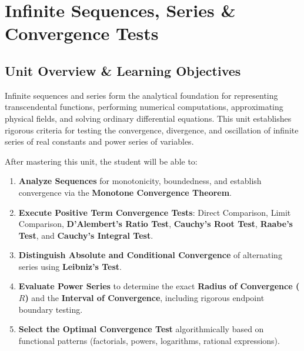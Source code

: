 \chapter{Infinite Sequences, Series \& Convergence Tests}
\label{chap:infinite-series-and-power-series}

\section{Unit Overview \& Learning Objectives}

Infinite sequences and series form the analytical foundation for representing transcendental functions, performing numerical computations, approximating physical fields, and solving ordinary differential equations. This unit establishes rigorous criteria for testing the convergence, divergence, and oscillation of infinite series of real constants and power series of variables.

\begin{important}
After mastering this unit, the student will be able to:
\begin{enumerate}[leftmargin=1.5em]
    \item \textbf{Analyze Sequences} for monotonicity, boundedness, and establish convergence via the \textbf{Monotone Convergence Theorem}.
    \item \textbf{Execute Positive Term Convergence Tests}: Direct Comparison, Limit Comparison, \textbf{D'Alembert's Ratio Test}, \textbf{Cauchy's Root Test}, \textbf{Raabe's Test}, and \textbf{Cauchy's Integral Test}.
    \item \textbf{Distinguish Absolute and Conditional Convergence} of alternating series using \textbf{Leibniz's Test}.
    \item \textbf{Evaluate Power Series} to determine the exact \textbf{Radius of Convergence ($R$)} and the \textbf{Interval of Convergence}, including rigorous endpoint boundary testing.
    \item \textbf{Select the Optimal Convergence Test} algorithmically based on functional patterns (factorials, powers, logarithms, rational expressions).
\end{enumerate}
\end{important}

